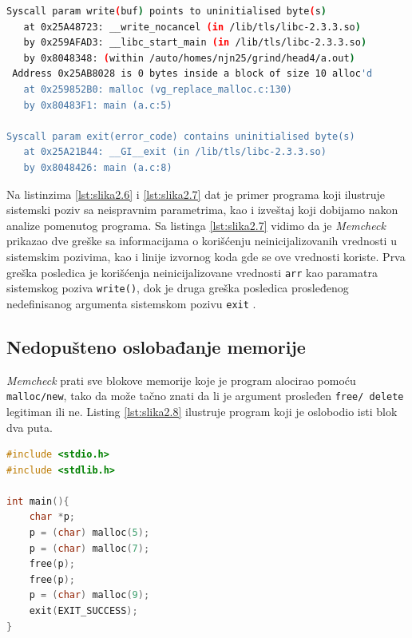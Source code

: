 \documentclass[12pt,oneside]{memoir}
\theoremstyle{plain}
\theoremstyle{definition}
\begin{document}

\begin{lstlisting}[style=terminal,caption={Primer ispisa greške korišćenja neinicializovane ili neadresirane vrednosti u sistemskom pozivu}, label={lst:slika2.7},language={bash}] 
Syscall param write(buf) points to uninitialised byte(s)
   at 0x25A48723: __write_nocancel (in /lib/tls/libc-2.3.3.so)
   by 0x259AFAD3: __libc_start_main (in /lib/tls/libc-2.3.3.so)
   by 0x8048348: (within /auto/homes/njn25/grind/head4/a.out)
 Address 0x25AB8028 is 0 bytes inside a block of size 10 alloc'd
   at 0x259852B0: malloc (vg_replace_malloc.c:130)
   by 0x80483F1: main (a.c:5)

Syscall param exit(error_code) contains uninitialised byte(s)
   at 0x25A21B44: __GI__exit (in /lib/tls/libc-2.3.3.so)
   by 0x8048426: main (a.c:8)
\end{lstlisting}

Na listinzima \ref{lst:slika2.6} i \ref{lst:slika2.7} dat je primer programa koji ilustruje sistemski poziv sa neispravnim parametrima, kao i izveštaj koji dobijamo nakon analize pomenutog programa. Sa listinga \ref{lst:slika2.7} vidimo da je \textit{Memcheck} prikazao dve greške sa informacijama o korišćenju neinicijalizovanih vrednosti u sistemskim pozivima, kao i linije izvornog koda gde se ove vrednosti koriste. Prva greška posledica je korišćenja neinicijalizovane vrednosti \texttt{arr} kao paramatra sistemskog poziva \texttt{write()}, dok je druga greška posledica prosleđenog nedefinisanog argumenta sistemskom pozivu \texttt{exit} \cite{Memcheck}. 

\subsection{Nedopušteno oslobađanje memorije}
\textit{Memcheck} prati sve blokove memorije koje je program alocirao pomoću \texttt{malloc/new}, tako da može tačno znati da li je argument prosleđen \texttt{free/ delete} legitiman ili ne. Listing \ref{lst:slika2.8} ilustruje program koji je oslobodio isti blok dva puta. 

\begin{lstlisting}[style=mystyle,caption={Program koji oslobađa isti blok dva puta}, label={lst:slika2.8},language={C}] 
#include <stdio.h>
#include <stdlib.h>

int main(){
	char *p;
	p = (char) malloc(5);
	p = (char) malloc(7);
	free(p);
	free(p);
	p = (char) malloc(9);
	exit(EXIT_SUCCESS);
}
\end{lstlisting}
\end{document}
